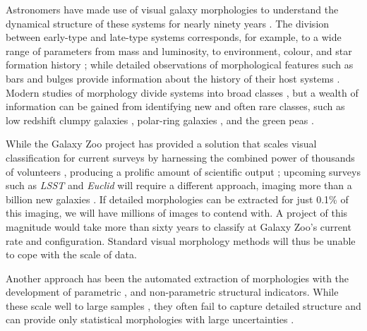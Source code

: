 \documentclass[twocolumn,  trackchanges,]{aastex6}%
\begin{document}
Astronomers have made use of visual galaxy morphologies to understand the dynamical structure of these systems for nearly ninety years 
\citep[e.g.,][]{Hubble1936, 
			deVauc1959, 
			Sandage1961, 
			vandenBergh1976, 
			NairAbraham2010, 
			Baillard2011}. 
The division between early-type and late-type systems corresponds, for example, to a wide range of parameters from mass and luminosity, to environment, colour, and star formation history 
\citep[e.g.,][]{Kormendy1977,  
			Dressler1980, 
			Strateva2001, 
			Blanton2003, 
			Kauffman2003, 
			Nakamura2003, 
			Shen2003, 
			Peng2010}; 
while detailed observations of morphological features such as bars and bulges 
provide information about the history of their host systems 
\citep[e.g., review by][]{KK04, 
			Elmegreen2008, 
			Sheth2008, 
			Masters2010, 
			Simmons2014}. 
Modern studies of morphology  divide systems into broad classes 
\citep[e.g.,][]{Conselice2006, 
			Lintott2008, 
			Kartaltepe2015, 
			Peth2016}, 
but a wealth of information can be gained from identifying new and often rare classes, 
such as low redshift clumpy galaxies \citep[e.g.,][]{Elmegreen2013}, polar-ring galaxies \citep[e.g.,][]{Whitmore1990}, and the green peas \citep{Cardamone2009}. 


While the Galaxy Zoo project has provided a solution that scales visual classification 
for current surveys  by harnessing the combined power of thousands of volunteers \citep{Lintott2008, Lintott2011, Willett2013, Willett2017, Simmons2017},
 producing a prolific amount of scientific output \citep[e.g.,][]{Land2008, Bamford2009,
 Darg2010, Schawinski2014, Galloway2015, Smethurst2016}; upcoming surveys such as
 \textit{LSST} and \textit{Euclid} will require a different approach, imaging more than
 a billion new galaxies  \citep{LSST, Euclid}.  If detailed morphologies can be extracted 
for just  0.1\% of this imaging, we will have millions of images to contend with. 
A project of this magnitude would take more than sixty years to classify at 
Galaxy Zoo's current rate and configuration. Standard visual morphology    
methods will thus be unable to cope with the scale of data. 

Another approach has been the automated extraction of morphologies with the
 development of parametric \citep{Sersic1968, Odewahn2002, Peng2002}, 
and non-parametric \citep{Abraham1994, Conselice2003, Abraham2003, Lotz2004,
 Freeman2013} structural indicators. While these scale well to large samples 
\citep[e.g.,][]{Simard2011, 
			Griffith2012, 
			Casteels2014, 
			Holwerda2014, 
			Meert2016}, 
they often fail to capture detailed structure and can provide only statistical morphologies with large uncertainties \cite[e.g.,][]{Abraham1996, Bershady2000}. 
\end{document}
